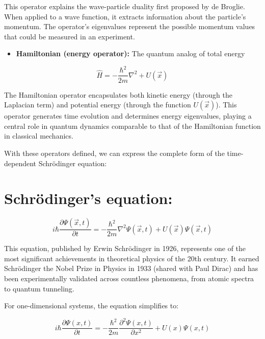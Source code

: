 \documentclass[italian]{HKNdocument}
\begin{document}
This operator explains the wave-particle duality first proposed by de Broglie. When applied to a wave function, it extracts information about the particle's momentum. The operator's eigenvalues represent the possible momentum values that could be measured in an experiment.

\begin{itemize}
  \item \textbf{Hamiltonian (energy operator):} The quantum analog of total energy
\end{itemize}

\begin{equation*}
\hat{H}=-\frac{\hbar^{2}}{2 m} \nabla^{2}+U(\vec{x}) \tag{1.14}
\end{equation*}

The Hamiltonian operator encapsulates both kinetic energy (through the Laplacian term) and potential energy (through the function $U(\vec{x})$). This operator generates time evolution and determines energy eigenvalues, playing a central role in quantum dynamics comparable to that of the Hamiltonian function in classical mechanics.

With these operators defined, we can express the complete form of the time-dependent Schrödinger equation:

\section*{Schrödinger's equation:}

\begin{equation*}
i \hbar \frac{\partial \Psi(\vec{x}, t)}{\partial t}=-\frac{\hbar^{2}}{2 m} \nabla^{2} \Psi(\vec{x}, t)+U(\vec{x}) \Psi(\vec{x}, t) \tag{1.15}
\end{equation*}

This equation, published by Erwin Schrödinger in 1926, represents one of the most significant achievements in theoretical physics of the 20th century. It earned Schrödinger the Nobel Prize in Physics in 1933 (shared with Paul Dirac) and has been experimentally validated across countless phenomena, from atomic spectra to quantum tunneling.

For one-dimensional systems, the equation simplifies to:

\begin{equation*}
i \hbar \frac{\partial \Psi(x, t)}{\partial t}=-\frac{\hbar^{2}}{2 m} \frac{\partial^{2} \Psi(x, t)}{\partial x^{2}}+U(x) \Psi(x, t) \tag{1.16}
\end{equation*}
\end{document}
